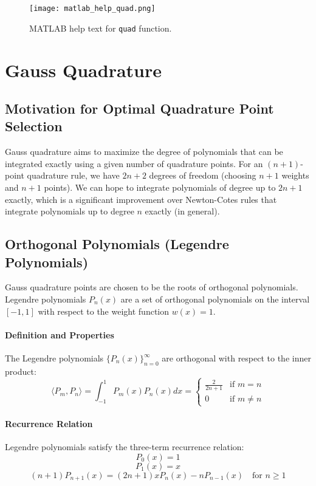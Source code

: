 \documentclass{article}
\begin{document}
\begin{figure}[h]
    \centering
    \texttt{[image: matlab\_help\_quad.png]}
    \caption{MATLAB help text for \texttt{quad} function.}
    \label{fig:matlab_help_quad}
\end{figure}


\section{Gauss Quadrature}

\subsection{Motivation for Optimal Quadrature Point Selection}
Gauss quadrature aims to maximize the degree of polynomials that can be integrated exactly using a given number of quadrature points. For an $(n+1)$-point quadrature rule, we have $2n+2$ degrees of freedom (choosing $n+1$ weights and $n+1$ points). We can hope to integrate polynomials of degree up to $2n+1$ exactly, which is a significant improvement over Newton-Cotes rules that integrate polynomials up to degree $n$ exactly (in general).

\subsection{Orthogonal Polynomials (Legendre Polynomials)}
Gauss quadrature points are chosen to be the roots of orthogonal polynomials. Legendre polynomials $P_n(x)$ are a set of orthogonal polynomials on the interval $[-1, 1]$ with respect to the weight function $w(x) = 1$.

\paragraph{Definition and Properties}
The Legendre polynomials $\{P_n(x)\}_{n=0}^\infty$ are orthogonal with respect to the inner product:
\[
\langle P_m, P_n \rangle = \int_{-1}^1 P_m(x) P_n(x) dx = \begin{cases} \frac{2}{2n+1} & \text{if } m = n \\ 0 & \text{if } m \neq n \end{cases}
\]

\paragraph{Recurrence Relation}
Legendre polynomials satisfy the three-term recurrence relation:
\[
P_0(x) = 1
\]
\[
P_1(x) = x
\]
\[
(n+1)P_{n+1}(x) = (2n+1)xP_n(x) - nP_{n-1}(x) \quad \text{for } n \geq 1
\]
\end{document}
